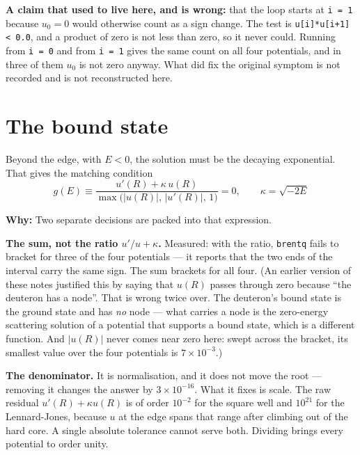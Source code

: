 \documentclass[11pt,a4paper]{article}
\newcommand{\why}[1]{\medskip\noindent\textbf{Why:} #1\medskip}
\begin{document}
\textbf{A claim that used to live here, and is wrong:} that the loop starts at
\texttt{i = 1} because $u_0 = 0$ would otherwise count as a sign change. The
test is \texttt{u[i]*u[i+1] < 0.0}, and a product of zero is not less than zero,
so it never could. Running from \texttt{i = 0} and from \texttt{i = 1} gives the
same count on all four potentials, and in three of them $u_0$ is not zero
anyway. What did fix the original symptom is not recorded and is
not reconstructed here.

\section{The bound state}
\label{sec:bound}

Beyond the edge, with $E<0$, the solution must be the decaying exponential. That
gives the matching condition
\begin{equation}
  \boxed{\;g(E) \equiv
    \frac{u'(R) + \kappa\,u(R)}{\max\bigl(|u(R)|,\,|u'(R)|,\,1\bigr)} = 0,
    \qquad \kappa = \sqrt{-2E}\;}
  \label{eq:match}
\end{equation}

\why{Two separate decisions are packed into that expression.

\textbf{The sum, not the ratio $u'/u + \kappa$.} Measured: with the ratio,
\texttt{brentq} fails to bracket for three of the four potentials --- it reports
that the two ends of the interval carry the same sign. The sum brackets for all
four. (An earlier version of these notes justified this by saying that $u(R)$
passes through zero because ``the deuteron has a node''. That is wrong twice
over. The deuteron's bound state is the ground state and has \emph{no} node ---
what carries a node is the zero-energy scattering solution of a potential that
supports a bound state, which is a different function. And $|u(R)|$ never comes
near zero here: swept across the bracket, its smallest value over the four
potentials is $7\times10^{-3}$.)

\textbf{The denominator.} It is normalisation, and it does not move the root ---
removing it changes the answer by $3\times10^{-16}$. What it fixes is scale.
The raw residual $u'(R) + \kappa u(R)$ is of order $10^{-2}$ for the square well
and $10^{21}$ for the Lennard-Jones, because $u$ at the edge spans that range
after climbing out of the hard core. A single absolute tolerance cannot serve
both. Dividing brings every potential to order unity.}
\end{document}
